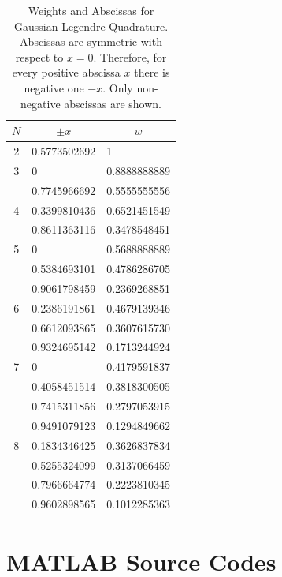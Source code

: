 \begin{table}[h]
\center
\caption{Weights and Abscissas for Gaussian-Legendre Quadrature. Abscissas are symmetric with respect to $x=0$.  Therefore, for every positive abscissa $x$ there is negative one $-x$. Only non-negative abscissas are shown.}
\footnotesize
\begin{center}
\begin{tabular}{|c|ll|}
\hline
\multicolumn{1}{|c|}{$N$}&\multicolumn{1}{c}{$\pm x$}&\multicolumn{1}{c|}{$w$}\\
\hline
2 
  & 0.5773502692 & 1            \\
\hline
3 
  & 0            & 0.8888888889\\
  & 0.7745966692 & 0.5555555556\\
\hline
4 
  & 0.3399810436 & 0.6521451549\\
  & 0.8611363116 & 0.3478548451\\ 
\hline
5 
  & 0            & 0.5688888889\\
  & 0.5384693101 & 0.4786286705\\
  & 0.9061798459 & 0.2369268851\\
\hline
6
  & 0.2386191861 & 0.4679139346\\
  & 0.6612093865 & 0.3607615730\\
  & 0.9324695142 & 0.1713244924\\
\hline
7 
  & 0            & 0.4179591837\\
  & 0.4058451514 & 0.3818300505\\
  & 0.7415311856 & 0.2797053915\\
  & 0.9491079123 & 0.1294849662\\
\hline
8 & 0.1834346425 & 0.3626837834\\
  & 0.5255324099 & 0.3137066459\\
  & 0.7966664774 & 0.2223810345\\
  & 0.9602898565 & 0.1012285363\\
\hline
\end{tabular}\label{tab:Gaussian-Legendre}
\end{center}
\end{table}



\newpage
\section*{MATLAB Source Codes}

